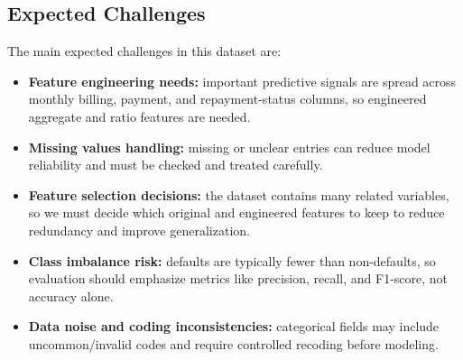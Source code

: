 \subsection{Expected Challenges}
The main expected challenges in this dataset are:
\begin{itemize}
	\item \textbf{Feature engineering needs:} important predictive signals are spread across monthly billing, payment, and repayment-status columns, so engineered aggregate and ratio features are needed.
	\item \textbf{Missing values handling:} missing or unclear entries can reduce model reliability and must be checked and treated carefully.
	\item \textbf{Feature selection decisions:} the dataset contains many related variables, so we must decide which original and engineered features to keep to reduce redundancy and improve generalization.
	\item \textbf{Class imbalance risk:} defaults are typically fewer than non-defaults, so evaluation should emphasize metrics like precision, recall, and F1-score, not accuracy alone.
	\item \textbf{Data noise and coding inconsistencies:} categorical fields may include uncommon/invalid codes and require controlled recoding before modeling.
\end{itemize}
